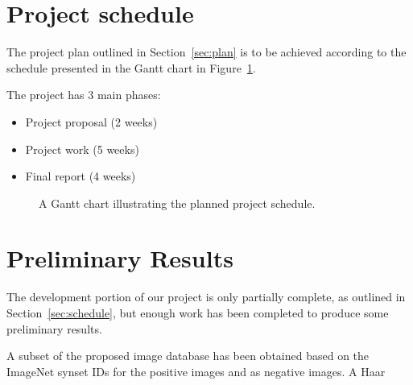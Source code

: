 \documentclass[11pt]{scrartcl}
\begin{document}
{{            %


        }

	}

	\section{Project schedule} {
    \label{sec:schedule}

        The project plan outlined in Section~\ref{sec:plan} is to be achieved
        according to the schedule presented in the Gantt chart in
        Figure~\ref{gantt:proposal}.

        The project has 3 main phases:
        
        \begin{itemize}
        	\item Project proposal (2 weeks)
        	\item Project work (5 weeks)
        	\item Final report (4 weeks)
        \end{itemize}


		\begin{figure}[H]
	        \makebox[\textwidth][c]{\resizebox{0.95\paperwidth}{!}{}}
			\caption[Project Schedule] {
                A Gantt chart illustrating the planned project schedule.
			}
			\label{gantt:proposal}
		\end{figure}
	}

    \section{Preliminary Results} {
    \label{sec:results}

        The development portion of our project is only partially complete, as outlined in Section~\ref{sec:schedule}, but enough work has been completed to produce some preliminary results.

        A subset of the proposed image database has been obtained based on the ImageNet synset IDs  for the positive images and  as negative images.
        A Haar 

    }
\end{document}
